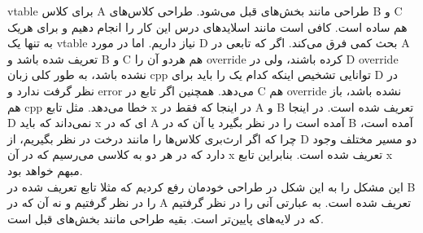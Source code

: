 vtable 
برای کلاس‌ A طراحی مانند بخش‌های قبل می‌شود. طراحی کلاس‌های B و C هم ساده است. کافی است مانند اسلایدهای درس این کار را انجام دهیم و برای هریک به تنها یک vtable نیاز داریم. اما در مورد D بحث کمی فرق می‌کند. اگر که تابعی در A تعریف شده باشد و B و C هم هردو آن را override کرده باشند، ولی در D override نشده باشد، به طور کلی زبان cpp توانایی تشخیص اینکه کدام یک را باید برای D در نظر گرفت ندارد و error می‌دهد. همچنین اگر تابع در C هم override نشده باشد، باز هم cpp خطا می‌دهد. مثل تابع x در اینجا که فقط در A و B تعریف شده است. در اینجا D نمی‌داند که باید x ای که در A آمده است را در نظر بگیرد یا آن که در B آمده است، چرا که اگر ارث‌بری کلاس‌ها را مانند درخت در نظر بگیریم، از D دو مسیر مختلف وجود دارد که در هر دو به کلاسی می‌رسیم که در آن x تعریف شده است. بنابراین تابع x مبهم خواهد بود.
\\
این مشکل را به این شکل در طراحی خودمان رفع کردیم که مثلا تابع تعریف شده در B را در نظر گرفتیم و نه آن که در A تعریف شده است. به عبارتی آنی را در نظر گرفتیم که در لایه‌های پایین‌تر است. بقیه طراحی مانند بخش‌های قبل است.






